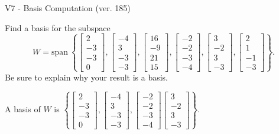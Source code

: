 \begin{exercise}
  \begin{exerciseTitle}V7 - Basis Computation (ver. 185)\end{exerciseTitle}
  \begin{exerciseStatement}
    Find a basis for the subspace 
\[W=\mathrm{span}\ \left\{\left[\begin{array}{r}
2 \\
-3 \\
-3 \\
0
\end{array}\right] , \left[\begin{array}{r}
-4 \\
3 \\
-3 \\
-3
\end{array}\right] , \left[\begin{array}{r}
16 \\
-9 \\
21 \\
15
\end{array}\right] , \left[\begin{array}{r}
-2 \\
-2 \\
-3 \\
-4
\end{array}\right] , \left[\begin{array}{r}
3 \\
-2 \\
3 \\
-3
\end{array}\right] , \left[\begin{array}{r}
2 \\
1 \\
-1 \\
-3
\end{array}\right]\right\}.\]
 Be sure to explain why your result is a basis.


  \end{exerciseStatement}
  \begin{exerciseAnswer}
   A basis of \(W\) is  \(\left\{\left[\begin{array}{r}
2 \\
-3 \\
-3 \\
0
\end{array}\right] , \left[\begin{array}{r}
-4 \\
3 \\
-3 \\
-3
\end{array}\right] , \left[\begin{array}{r}
-2 \\
-2 \\
-3 \\
-4
\end{array}\right] \left[\begin{array}{r}
3 \\
-2 \\
3 \\
-3
\end{array}\right]\right\}\).
  


  \end{exerciseAnswer}
\end{exercise}